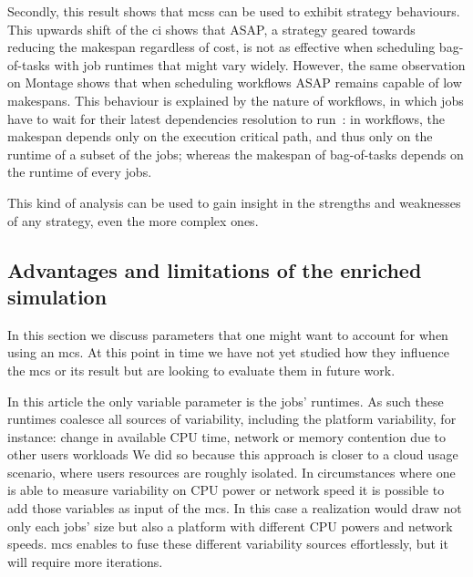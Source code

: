 \documentclass[10pt,conference,compsocconf]{IEEEtran}
\begin{document}
Secondly, this result shows that \ac{mcs}s can be used to exhibit strategy
behaviours. This upwards shift of the \ac{ci} shows that ASAP, a strategy
geared towards reducing the makespan regardless of cost, is not as effective
when scheduling bag-of-tasks with job runtimes that might vary
widely. However, the same observation on Montage shows that when
scheduling workflows ASAP remains capable of low makespans. 
This behaviour is explained by the nature of workflows,
in which jobs have to wait for their latest dependencies resolution to run~: 
in workflows, the makespan depends only on the execution critical path, and thus
only on the runtime of a subset of the jobs; whereas the makespan of bag-of-tasks 
depends on the runtime of every jobs.

This kind of analysis can be used to gain insight in the strengths and
weaknesses of any strategy, even the more complex ones.


\subsection{Advantages and limitations of the enriched simulation}\label{sec:lim}

In this section we discuss parameters that one might want to account for when
using an \ac{mcs}. At this point in time we have not yet studied how they
influence the \ac{mcs} or its result but are looking to evaluate them in
future work.

In this article the only variable parameter is the jobs' runtimes. As such these
runtimes coalesce all sources of variability, including the platform variability,
for instance: change in available CPU time, network or memory contention due to other users workloads
We did so because this approach is closer to a cloud usage scenario, where users
resources are roughly isolated.
In circumstances where one is able to measure variability
on CPU power or network speed it is possible to add those variables as input of
the \ac{mcs}. In this case a realization would draw not only each jobs' size 
 but also a platform with different CPU powers and network speeds.
\ac{mcs} enables to fuse these different variability sources effortlessly, but it will
require more iterations. 
\end{document}
